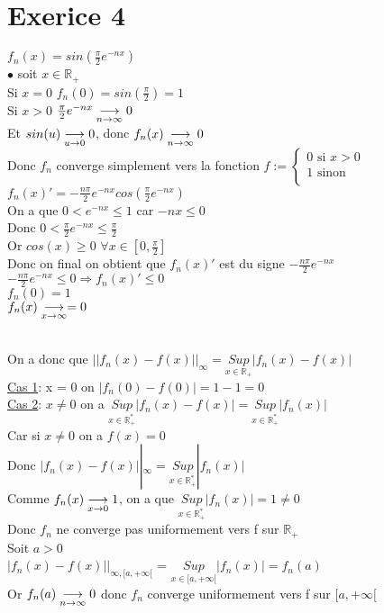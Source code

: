 \documentclass{article}
\author{Frederic Becerril}
\newcommand{\mysupp}[1]{\underset{x \in #1}{Sup}}
\begin{document}
\part*{Exerice 4}

$f_n(x) = sin(\frac{\pi}{2}e^{-nx})$\\
$\bullet$ soit $x \in \mathbb{R_+}$\\
Si $x = 0$ $f_n(0) = sin(\frac{\pi}{2}) = 1$\\
Si $x > 0$ $\frac{\pi}{2}e^{-nx} \mylim 0$\\
Et $sin(u) \mylim[u][0] 0$, donc $f_n(x) \mylim 0$\\
Donc $f_n$ converge simplement vers la fonction $f := \left\{
\begin{array}{ll}
    0 \mbox{ si } x > 0\\
    1 \mbox{ sinon }\\
\end{array}
\right.$\\
$f_n(x)' = -\frac{n\pi}{2}e^{-nx} cos(\frac{\pi}{2}e^{-nx})$\\
On a que $0 < e^{-nx} \leq 1$ car $-nx \leq 0$\\
Donc $0 < \frac{\pi}{2}e^{-nx} \leq \frac{\pi}{2}$\\
Or $cos(x) \geq 0$ $\forall x \in [0, \frac{\pi}{2}]$\\
Donc on final on obtient que $f_n(x)'$ est du signe $-\frac{n\pi}{2}e^{-nx}$\\
$-\frac{n\pi}{2}e^{-nx} \leq 0 \Rightarrow f_n(x)' \leq 0$\\
$f_n(0) = 1$\\
$f_n(x) \mylim[x][\infty] = 0$\\
\\
On a donc que $||f_n(x) - f(x)||_\infty = \mysupp{\mathbb{R}_+} |f_n(x) - f(x)|$\\
\underline{Cas 1}: x = 0 on $|f_n(0) - f(0)| = 1 - 1 = 0$\\
\underline{Cas 2}: $x \neq 0$ on a $\mysupp{\mathbb{R}^*_+} |f_n(x) - f(x)| = \mysupp{\mathbb{R}^*_+} |f_n(x)|$\\
Car si $x \neq 0$ on a $f(x) = 0$\\
Donc $|f_n(x) - f(x)||_\infty = \mysupp{\mathbb{R}^*_+} |f_n(x)|$\\
Comme $f_n(x) \mylim[x][0] 1$, on a que $\mysupp{\mathbb{R}^*_+} |f_n(x)| = 1 \neq 0$\\
Donc $f_n$ ne converge pas uniformement vers f sur $\mathbb{R}_+$\\
Soit $a > 0$\\
$|f_n(x) - f(x)||_{\infty, [a, +\infty[}$ = $\mysupp{[a, +\infty[} |f_n(x)| = f_n(a)$\\
Or $f_n(a) \mylim 0$ donc $f_n$ converge uniformement vers f sur $[a, +\infty[$\\
\end{document}
